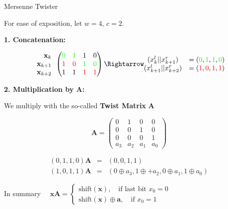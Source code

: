 \documentclass[11pt,compress,t,notes=noshow, xcolor=table]{beamer}
\begin{document}
\begin{vbframe}{Mersenne Twister}
\begin{enumerate}
\framebreak

For ease of exposition, let $w = 4$, $c = 2$.

\lz

\textbf{1. Concatenation:}

$$
\begin{array}{r} \mathbf{x}_k \\ \mathbf{x}_{k + 1} \\ \mathbf{x}_{k + 2} \end{array}\begin{pmatrix} \textcolor{green}{0} & \textcolor{green}{1} & 1 & 0 \\
\textcolor{red}{1} & \textcolor{red}{0} & \textcolor{green}{1} & \textcolor{green}{0} \\
1 & 1 & \textcolor{red}{1} & \textcolor{red}{1}
\end{pmatrix} \Rightarrow \begin{matrix}
(x_{k}^l || x_{k + 1}^r) & = (\textcolor{green}{0}, \textcolor{green}{1}, \textcolor{green}{1}, \textcolor{green}{0}) \\
(x_{k + 1}^l || x_{k + 2}^r) & = (\textcolor{red}{1}, \textcolor{red}{0}, \textcolor{red}{1}, \textcolor{red}{1})
\end{matrix}
$$

\framebreak
\begin{footnotesize}
\textbf{2. Multiplication by $\mathbf{A}$: }


We multiply with the so-called \textbf{Twist Matrix} $\mathbf{A}$

$$
\mathbf{A} = \begin{pmatrix}
0 & 1 & 0 & 0  \\
0 & 0 & 1 & 0 \\
 0 & 0 & 0 & 1 \\
a_{3} & a_{2} & a_{1} & a_0
\end{pmatrix}
$$

\begin{eqnarray*}
(0, 1, 1, 0)  \mathbf{A} &=& (0, 0, 1, 1)\\
(1, 0, 1, 1) \mathbf{A} &=& (0 \oplus a_3, 1 \oplus + a_2, 0 \oplus a_1, 1 \oplus a_0)
\end{eqnarray*}

In summary $\quad
\mathbf{x}\mathbf{A} = \begin{cases}
\text{shift}(\mathbf{x}), \quad \text{if last bit } x_0 = 0 \\
\text{shift}(\mathbf{x}) \oplus \mathbf{a} , \quad \text{if } x_0 = 1
\end{cases}
$


\end{footnotesize}
\end{enumerate}
\end{vbframe}
\end{document}
